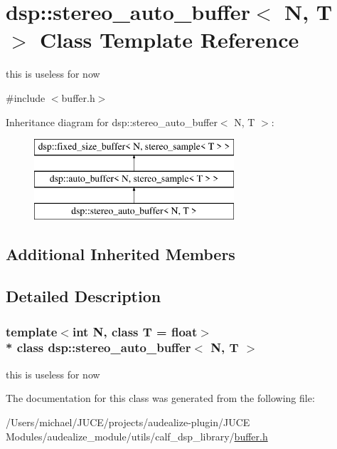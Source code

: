 \hypertarget{classdsp_1_1stereo__auto__buffer}{}\section{dsp\+:\+:stereo\+\_\+auto\+\_\+buffer$<$ N, T $>$ Class Template Reference}
\label{classdsp_1_1stereo__auto__buffer}


this is useless for now  




{\ttfamily \#include $<$buffer.\+h$>$}

Inheritance diagram for dsp\+:\+:stereo\+\_\+auto\+\_\+buffer$<$ N, T $>$\+:\begin{figure}[H]
\begin{center}
\leavevmode
\includegraphics[height=3.000000cm]{classdsp_1_1stereo__auto__buffer}
\end{center}
\end{figure}
\subsection*{Additional Inherited Members}


\subsection{Detailed Description}
\subsubsection*{template$<$int N, class T = float$>$\\*
class dsp\+::stereo\+\_\+auto\+\_\+buffer$<$ N, T $>$}

this is useless for now 

The documentation for this class was generated from the following file\+:\begin{DoxyCompactItemize}
\item 
/\+Users/michael/\+J\+U\+C\+E/projects/audealize-\/plugin/\+J\+U\+C\+E Modules/audealize\+\_\+module/utils/calf\+\_\+dsp\+\_\+library/\hyperlink{buffer_8h}{buffer.\+h}\end{DoxyCompactItemize}
